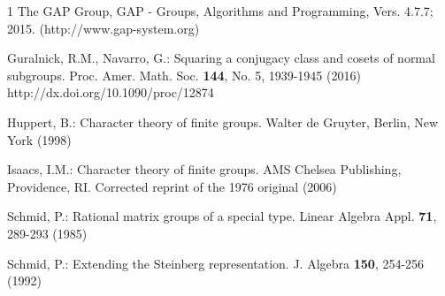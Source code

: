 \documentclass[12pt,leqno,a4paper]{amsart}
\numberwithin{equation}{section}
\begin{document}
\begin{thebibliography}{1}
 The GAP Group, GAP - Groups, Algorithms and Programming, Vers.
4.7.7; 2015. (http://www.gap-system.org)


Guralnick, R.M., Navarro, G.:
 \newblock Squaring a conjugacy class and cosets of normal subgroups.
 \newblock Proc. Amer. Math. Soc. {\bf 144}, No. 5, 1939-1945 (2016)
  http://dx.doi.org/10.1090/proc/12874




  Huppert, B.:
Character theory of finite groups. Walter  de Gruyter, Berlin, New York  (1998)


  Isaacs, I.M.:
Character theory of finite groups. AMS Chelsea Publishing, Providence,
RI. Corrected reprint of the 1976 original (2006)









 Schmid, P.:
  Rational matrix groups of a special type. Linear Algebra Appl. {\bf  71}, 289-293 (1985)


Schmid, P.:
Extending the Steinberg representation. J. Algebra {\bf 150}, 254-256 (1992)







\end{thebibliography}
\end{document}
